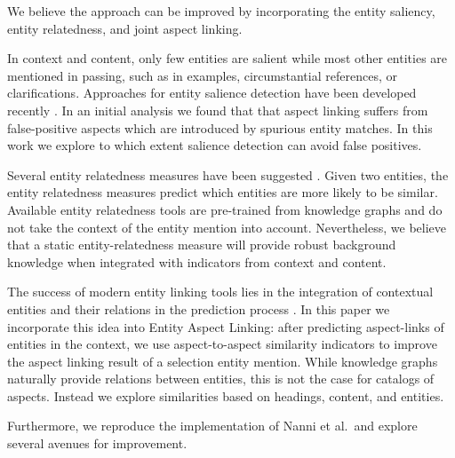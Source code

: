 We believe the approach can be improved by incorporating the entity saliency, entity relatedness, and joint aspect linking.  

In context and content, only few entities are salient while most other entities are mentioned in passing, such as in examples, circumstantial references, or clarifications. Approaches for entity salience detection have been developed  recently .   In an initial analysis we found that that aspect linking suffers from false-positive aspects which are introduced by spurious entity matches. In this work we explore to which extent salience detection can avoid false positives.


Several entity relatedness measures have been suggested \cite{ristoski2016rdf2vec} . Given two entities, the entity relatedness measures predict which entities are more likely to be similar. Available entity relatedness tools are pre-trained from knowledge graphs and do not take the context of the entity mention into account. Nevertheless, we believe that a static entity-relatedness measure will provide robust background knowledge when integrated with indicators from context and content.

The success of modern entity linking tools lies in the integration of contextual entities and their relations in the prediction process . In this paper we incorporate this idea into Entity Aspect Linking: after predicting aspect-links of entities in the context, we use aspect-to-aspect similarity indicators to improve the aspect linking result of a selection entity mention. While knowledge graphs naturally provide relations between entities, this is not the case for catalogs of aspects. Instead we explore similarities based on headings, content, and entities. 
 
Furthermore, we reproduce the implementation of Nanni et al.\ and explore several avenues for improvement.









